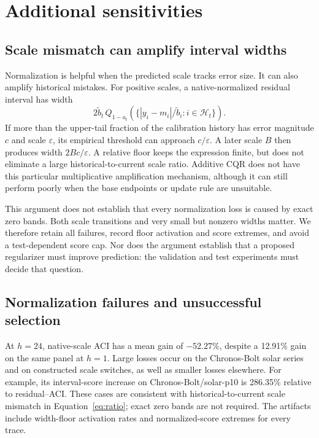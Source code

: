 \section{Additional sensitivities}\label{app:sensitivity}
\subsection{Scale mismatch can amplify interval widths}
Normalization is helpful when the predicted scale tracks error size. It can also amplify
historical mistakes. For positive scales, a native-normalized residual interval has width
\begin{equation}\label{eq:ratio}
 2\tilde b_t\,Q_{1-a_t}\!\left(\{|y_i-m_i|/\tilde b_i:i\in\mathcal H_t\}\right).
\end{equation}
If more than the upper-tail fraction of the calibration history has error magnitude $c$
and scale $\varepsilon$, its empirical threshold can approach $c/\varepsilon$. A later
scale $B$ then produces width $2Bc/\varepsilon$. A relative floor keeps the expression
finite, but does not eliminate a large historical-to-current scale ratio. Additive CQR
does not have this particular multiplicative amplification mechanism, although it can
still perform poorly when the base endpoints or update rule are unsuitable.

This argument does not establish that every normalization loss is caused by exact zero
bands. Both scale transitions and very small but nonzero widths matter. We therefore
retain all failures, record floor activation and score extremes, and avoid a test-dependent
score cap. Nor does the argument establish that a proposed regularizer must improve
prediction: the validation and test experiments must decide that question.

\subsection{Normalization failures and unsuccessful selection}
At $h=24$, native-scale ACI has a mean gain of $-52.27\%$, despite a 12.91\% gain on
the same panel at $h=1$. Large losses occur on the Chronos-Bolt solar series and on
constructed scale switches, as well as smaller losses elsewhere. For example, its
interval-score increase on Chronos-Bolt/solar-p10 is 286.35\% relative to residual--ACI.
These cases are consistent with historical-to-current scale mismatch in
Equation~\eqref{eq:ratio}; exact zero bands are not required. The artifacts include
width-floor activation rates and normalized-score extremes for every trace.

